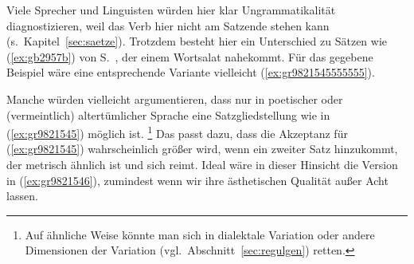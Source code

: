 \begin{exe}
\end{exe}

Viele Sprecher und Linguisten würden hier klar Ungrammatikalität diagnostizieren, weil das Verb hier nicht am Satzende stehen kann (s.\ Kapitel~\ref{sec:saetze}).
Trotzdem besteht hier ein Unterschied zu Sätzen wie (\ref{ex:gb2957b}) von S.\ \pageref{ex:gb2957b}, der einem Wortsalat nahekommt.
Für das gegebene Beispiel wäre eine entsprechende Variante vielleicht (\ref{ex:gr9821545555555}).

\begin{exe}
\end{exe}

Manche würden vielleicht argumentieren, dass nur in poetischer oder (vermeintlich) altertümlicher Sprache eine Satzgliedstellung wie in (\ref{ex:gr9821545}) möglich ist.%
\footnote{Auf ähnliche Weise könnte man sich in dialektale Variation oder andere Dimensionen der Variation (vgl.\ Abschnitt~\ref{sec:regulgen}) retten.}
Das passt dazu, dass die Akzeptanz für (\ref{ex:gr9821545}) wahrscheinlich größer wird, wenn ein zweiter Satz hinzukommt, der metrisch ähnlich ist und sich reimt.
Ideal wäre in dieser Hinsicht die Version in (\ref{ex:gr9821546}), zumindest wenn wir ihre ästhetischen Qualität außer Acht lassen.

\begin{exe}
\end{exe}

